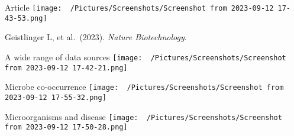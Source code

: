 \documentclass[
  5pt,
  ignorenonframetext,
]{beamer}
\begin{document}
\begin{frame}{Article}
\protect\hypertarget{article}{}
\texttt{[image: ~/Pictures/Screenshots/Screenshot from 2023-09-12 17-43-53.png]}

\tiny

Geistlinger L, et al.~(2023). \emph{Nature Biotechnology}.\vspace{0.5em}
\newline
\end{frame}

\begin{frame}{A wide range of data sources}
\protect\hypertarget{a-wide-range-of-data-sources}{}
\texttt{[image: ~/Pictures/Screenshots/Screenshot from 2023-09-12 17-42-21.png]}
\end{frame}

\begin{frame}{Microbe co-occurrence}
\protect\hypertarget{microbe-co-occurrence}{}
\texttt{[image: ~/Pictures/Screenshots/Screenshot from 2023-09-12 17-55-32.png]}
\end{frame}

\begin{frame}{Microorganisms and disease}
\protect\hypertarget{microorganisms-and-disease}{}
\texttt{[image: ~/Pictures/Screenshots/Screenshot from 2023-09-12 17-50-28.png]}
\end{frame}
\end{document}
